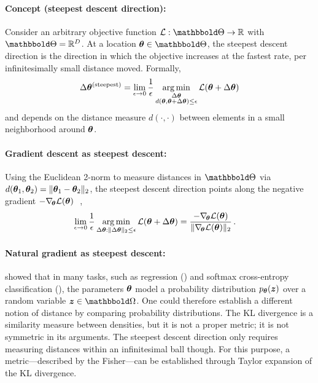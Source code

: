 \paragraph{Concept (steepest descent direction):} Consider an arbitrary
objective function $\gL: \sTheta \to \sR$ with $\sTheta = \sR^D$. At a location
$\vtheta \in \sTheta$, the steepest descent direction is the direction in which
the objective increases at the fastest rate, \ie per infinitesimally small
distance moved. Formally,
\begin{align}
  \label{eq:background::steepestDirection}
  \Delta {\bm{\theta}}^{(\text{steepest})}
  =
  \lim_{\epsilon \to 0} \frac{1}{\epsilon}
  \operatorname*{arg\,min}_{\substack{\Delta {\bm{\theta}} \\ d({\bm{\theta}}, {\bm{\theta}} + \Delta {\bm{\theta}}) \le \epsilon}}
  {\mathcal{L}}({\bm{\theta}} + \Delta {\bm{\theta}})
\end{align}
and depends on the distance measure $d(\cdot, \cdot)$ between elements in a
small neighborhood around ${\bm{\theta}}$.

\paragraph{Gradient descent as steepest descent:} Using the Euclidean 2-norm to
measure distances in $\sTheta$ via $d({\bm{\theta}}_1, {\bm{\theta}}_2) = \lVert {\bm{\theta}}_1 -
{\bm{\theta}}_2 \rVert_2$, the steepest descent direction points along the negative
gradient $-\nabla_{\!{{\bm{\theta}}}}{\mathcal{L}}({\bm{\theta}})$~\cite[][Chapter 6]{martens2014new}\,,
\begin{align}\label{eq:background::negativeGradientSteepestDescent}
  \lim_{\epsilon \to 0} \frac{1}{\epsilon}
  \operatorname*{arg\,min}_{\Delta {\bm{\theta}}: \lVert \Delta {\bm{\theta}} \rVert_2 \le \epsilon}
  {\mathcal{L}}({\bm{\theta}} + \Delta {\bm{\theta}})
  &=
    \frac{
    - \nabla_{\!{{\bm{\theta}}}}{\mathcal{L}}({\bm{\theta}})
    }{
    \lVert \nabla_{\!{{\bm{\theta}}}}{\mathcal{L}}({\bm{\theta}}) \rVert_2
    }\,.
\end{align}

\paragraph{Natural gradient as steepest descent:}
 showed that in many tasks,
such as regression () and softmax cross-entropy
classification (), the parameters ${\bm{\theta}}$
model a probability distribution $p_{{\bm{\theta}}}({\bm{z}})$ over a random variable $\vz
\in \sOmega$. One could therefore establish a different notion of distance by
comparing probability distributions. The KL divergence is a similarity measure
between densities, but it is not a proper metric; \eg it is not symmetric in its
arguments. The steepest descent direction only requires measuring distances
within an infinitesimal ball though. For this purpose, a metric---described by
the Fisher---can be established through Taylor expansion of the KL divergence.

